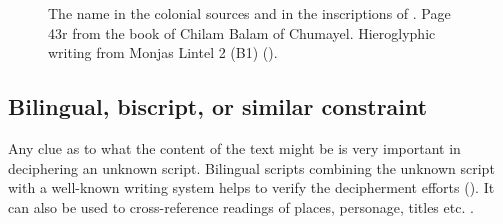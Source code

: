 \documentclass[../main.tex]{subfiles}
\begin{document}
\begin{figure}
    \centering
    \caption[\kakupakal in the colonial sources and inscriptions]
             {The name \kakupakal in the colonial sources and 
             in the inscriptions of \chichenitza.
              Page 43r from the book of 
             Chilam Balam of Chumayel.
             Hieroglyphic writing from \chichenitza Monjas Lintel 2 (B1) (\authordrawings).}
\end{figure}

\subsection{Bilingual, biscript, or similar constraint}
Any clue as to what the content of the text might be is very important in deciphering an 
unknown script.
Bilingual scripts combining the unknown script with a well-known writing system helps to
verify the decipherment efforts (\cite[44]{coe1992}).
It can also be used to cross-reference readings of places, personage, titles etc. 
.
\end{document}
